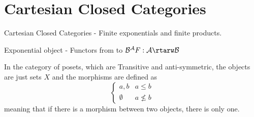\section{Cartesian Closed Categories}

Cartesian Closed Categories - Finite exponentials and finite products.

Exponential object - Functors from  to 
$ \mathcal{B}^{\mathcal{A}} F : \mathcal{A} \rtarw \mathcal{B} $

In the category of posets, which are Transitive and anti-symmetric, the objects are just sets $X$ and the morphisms are defined as
\[ \begin{cases} 
      {a, b} & a \leq b \\
      \emptyset & a \nleq b
   \end{cases}
 \]
 meaning that if there is a morphism between two objects, there is only one.